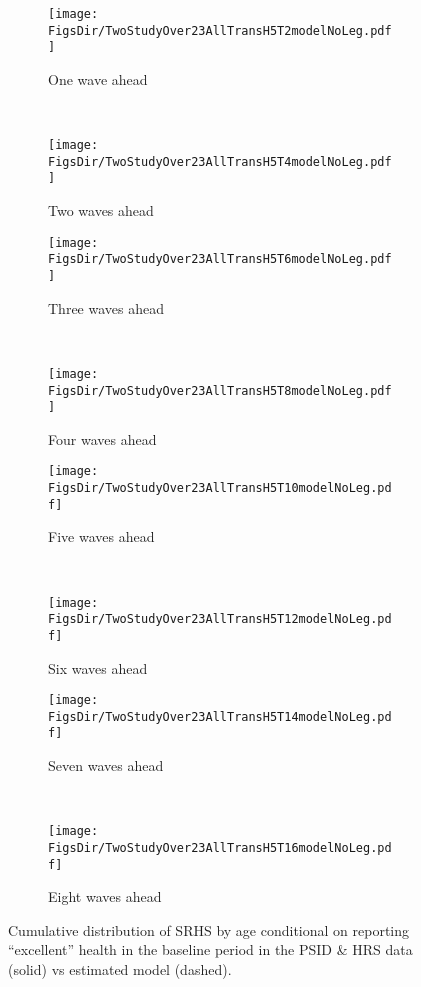 \documentclass[12pt,pdftex,letterpaper]{article}
\newcommand{\RootDir}{..}
\newcommand{\FigsDir}{\RootDir/Figures}
\begin{document}
\begin{figure}
	\centering
	\begin{subfigure}[b]{0.45\textwidth}
		\texttt{[image: \\FigsDir/TwoStudyOver23AllTransH5T2modelNoLeg.pdf]}
		\caption{One wave ahead}\label{fig:Model1AheadExcellent}
	\end{subfigure}
	~
	\begin{subfigure}[b]{0.45\textwidth}
		\texttt{[image: \\FigsDir/TwoStudyOver23AllTransH5T4modelNoLeg.pdf]}
		\caption{Two waves ahead}\label{fig:Model2AheadExcellent}
	\end{subfigure}
	
	\begin{subfigure}[b]{0.45\textwidth}
		\texttt{[image: \\FigsDir/TwoStudyOver23AllTransH5T6modelNoLeg.pdf]}
		\caption{Three waves ahead}\label{fig:Model3AheadExcellent}
	\end{subfigure}
	~
	\begin{subfigure}[b]{0.45\textwidth}
		\texttt{[image: \\FigsDir/TwoStudyOver23AllTransH5T8modelNoLeg.pdf]}
		\caption{Four waves ahead}\label{fig:Model4AheadExcellent}
	\end{subfigure}
	
	\begin{subfigure}[b]{0.45\textwidth}
		\texttt{[image: \\FigsDir/TwoStudyOver23AllTransH5T10modelNoLeg.pdf]}
		\caption{Five waves ahead}\label{fig:Model5AheadExcellent}
	\end{subfigure}
	~
	\begin{subfigure}[b]{0.45\textwidth}
		\texttt{[image: \\FigsDir/TwoStudyOver23AllTransH5T12modelNoLeg.pdf]}
		\caption{Six waves ahead}\label{fig:Model6AheadExcellent}
	\end{subfigure}
	
	\begin{subfigure}[b]{0.45\textwidth}
		\texttt{[image: \\FigsDir/TwoStudyOver23AllTransH5T14modelNoLeg.pdf]}
		\caption{Seven waves ahead}\label{fig:Model7AheadExcellent}
	\end{subfigure}
	~
	\begin{subfigure}[b]{0.45\textwidth}
		\texttt{[image: \\FigsDir/TwoStudyOver23AllTransH5T16modelNoLeg.pdf]}
		\caption{Eight waves ahead}\label{fig:Model8AheadExcellent}
	\end{subfigure}
	\caption{Cumulative distribution of SRHS by age conditional on reporting ``excellent'' health in the baseline period in the PSID \& HRS data (solid) vs estimated model (dashed).}\label{fig:ModelTransEX}
\end{figure}
\end{document}
